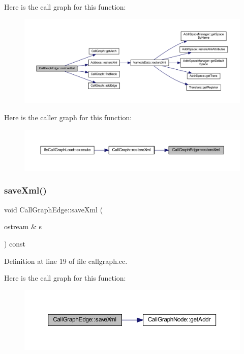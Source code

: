 Here is the call graph for this function\+:
\nopagebreak
\begin{figure}[H]
\begin{center}
\leavevmode
\includegraphics[width=350pt]{class_call_graph_edge_ab1136dde3188c5d224fbfb33ecc7cda7_cgraph}
\end{center}
\end{figure}
Here is the caller graph for this function\+:
\nopagebreak
\begin{figure}[H]
\begin{center}
\leavevmode
\includegraphics[width=350pt]{class_call_graph_edge_ab1136dde3188c5d224fbfb33ecc7cda7_icgraph}
\end{center}
\end{figure}
\mbox{\label{class_call_graph_edge_a78d99c85c0715d1f8bab9f898e6fc2d5}} 
\subsubsection{\texorpdfstring{saveXml()}{saveXml()}}
{\footnotesize\ttfamily void Call\+Graph\+Edge\+::save\+Xml (\begin{DoxyParamCaption}\item[{ostream \&}]{s }\end{DoxyParamCaption}) const}



Definition at line 19 of file callgraph.\+cc.

Here is the call graph for this function\+:
\nopagebreak
\begin{figure}[H]
\begin{center}
\leavevmode
\includegraphics[width=350pt]{class_call_graph_edge_a78d99c85c0715d1f8bab9f898e6fc2d5_cgraph}
\end{center}
\end{figure}


